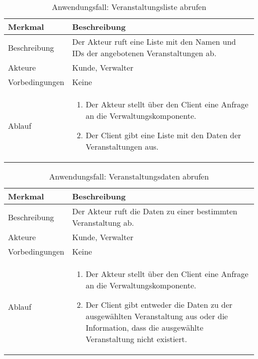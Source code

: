 \begin{table}[H]
    \centering
    \caption{Anwendungsfall: Veranstaltungsliste abrufen}
    \label{tab:use_case_list_events}
    \begin{tabularx}{\textwidth}{lX}
        \toprule
        \textbf{Merkmal} & \textbf{Beschreibung}  \\ \midrule
        Beschreibung    & Der Akteur ruft eine Liste mit den Namen und IDs der angebotenen Veranstaltungen ab. \\
        Akteure         & Kunde, Verwalter \\
        Vorbedingungen  & Keine \\
        Ablauf          & \begin{minipage}[t]{\linewidth}
        \vspace*{-3mm}
        \begin{enumerate}[leftmargin=*,nosep,after=\strut]
            \item Der Akteur stellt über den Client eine Anfrage an die Verwaltungskomponente.
            \item Der Client gibt eine Liste mit den Daten der Veranstaltungen aus.
        \end{enumerate} 
        \end{minipage} \\\bottomrule
    \end{tabularx}    
    \setlength\belowcaptionskip{4pt}
\end{table}

\begin{table}[H]
    \centering
    \caption{Anwendungsfall: Veranstaltungsdaten abrufen}
    \label{tab:use_case_get_event_data}
    \begin{tabularx}{\textwidth}{lX}
        \toprule
        \textbf{Merkmal} & \textbf{Beschreibung}  \\ \midrule
        Beschreibung    & Der Akteur ruft die Daten zu einer bestimmten Veranstaltung ab. \\
        Akteure         & Kunde, Verwalter \\
        Vorbedingungen  & Keine \\
        Ablauf          & \begin{minipage}[t]{\linewidth}
        \vspace*{-3mm}
        \begin{enumerate}[leftmargin=*,nosep,after=\strut]
            \item Der Akteur stellt über den Client eine Anfrage an die Verwaltungskomponente.
            \item Der Client gibt entweder die Daten zu der ausgewählten Veranstaltung aus oder die Information, dass die ausgewählte Veranstaltung nicht existiert.
        \end{enumerate}
        \end{minipage} \\\bottomrule
    \end{tabularx}    
\setlength\belowcaptionskip{4pt}
\end{table}

